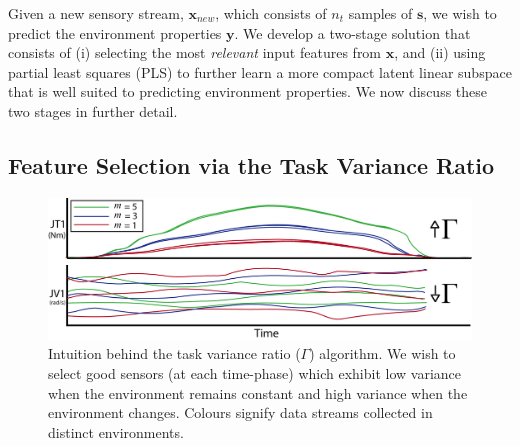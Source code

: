 


Given a new sensory stream, $\mathbf{x}_{new}$, which consists of $n_t$ samples of $\mathbf{s}$, we wish to predict the environment properties $\mathbf{y}$.
We develop a two-stage solution that consists of 
(i) selecting the most {\em relevant} input features from $\mathbf{x}$, and 
(ii) using partial least squares (PLS) to further learn a more compact latent linear subspace that is well suited to predicting environment properties.
We now discuss these two stages in further detail.

\subsection{Feature Selection via the Task Variance Ratio}
\label{sec:feature_selection}

\begin{figure}[tb]
  \centering
  \includegraphics[width=\linewidth]{images/TVR_intuition}
  \caption{Intuition behind the task variance ratio ($\Gamma$) algorithm. We wish to select good sensors (at each time-phase) which exhibit low variance when the environment remains constant and high variance when the environment changes. Colours signify data streams collected in distinct environments.}
  \label{fig:TVR_intuition}
\end{figure}

